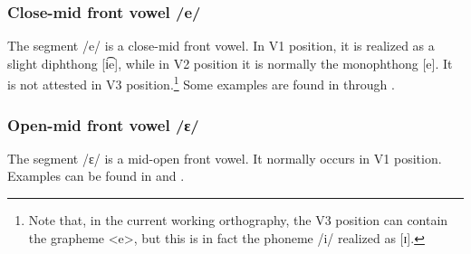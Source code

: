 \subsubsection{Close-mid front vowel /e/}
The segment /e/ is a close-mid front vowel. In V1 position, it is realized as a slight diphthong [i͡e], while in V2 position it is normally the monophthong [e]. It is not attested in V3 position.\footnote{Note that, in the current working orthography, the V3 position can contain the grapheme <e>, but this is in fact the phoneme /i/ realized as [ɪ].} 
Some examples are found in  through .




\subsubsection{Open-mid front vowel /ɛ/}\label{openE}
The segment /ɛ/ is a mid-open front vowel. It normally occurs in V1 position. %
Examples can be found in  and .


